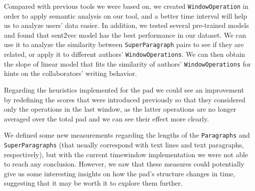 Compared with previous tools we were based on, we created \texttt{WindowOperation} in order to apply semantic analysis on our tool, and a better time interval will help us to analyze users' data easier. In addition, we tested several pre-trained models and found that sent2vec model has the best performance in our dataset. We can use it to analyze the similarity between \texttt{SuperParagraph} pairs to see if they are related, or apply it to different authors' \texttt{WindowOperations}. We can then obtain the slope of linear model that fits the similarity of authors' \texttt{WindowOperations} for hints on the collaborators' writing behavior.  

Regarding the heuristics implemented for the pad we could see an improvement by redefining the scores that were introduced previously so that they considered only the operations in the last window, as the latter operations are no longer averaged over the total pad and we can see their effect more clearly.

We defined some new measurements regarding the lengths of the \texttt{Paragraphs} and \texttt{SuperParagraphs} (that usually correspond with text lines and text paragraphs, respectively), but with the current timewindow implementation we were not able to reach any conclusion. However, we saw that these measures could potentially give us some interesting insights on how the pad's structure changes in time, suggesting that it may be worth it to explore them further.